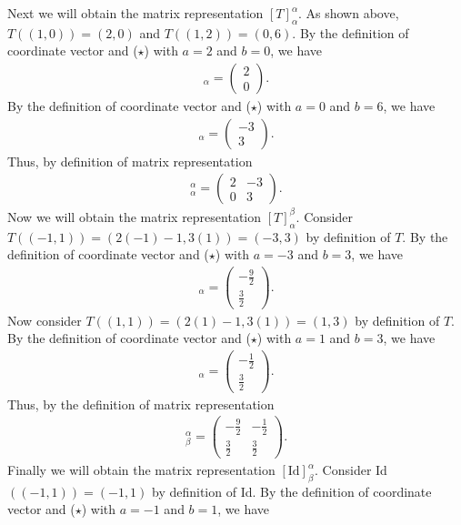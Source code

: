 \documentclass[12pt,answers]{exam}
\begin{document}
\begin{solution}
\begin{enumerate}[label=(\alph*)]
Next we will obtain the matrix representation $[T]^{\alpha}_{\alpha}$. As shown above, $T((1,0))=(2,0)$ and $T((1,2))=(0,6)$. By the definition of coordinate vector and ($\star$) with $a=2$ and $b=0$, we have
\begin{align*}
    [T(1,0)]_{\alpha}=\begin{pmatrix} 2 \\ 0 \end{pmatrix}.
\end{align*}
By the definition of coordinate vector and ($\star$) with $a=0$ and $b=6$, we have
\begin{align*}
    [T(1,2)]_{\alpha}=\begin{pmatrix} -3 \\ 3 \end{pmatrix}.
\end{align*}
Thus, by definition of matrix representation
\begin{align*}
    [T]^{\alpha}_{\alpha}=\begin{pmatrix} 2 & -3 \\ 0 & 3\end{pmatrix}.
\end{align*}
Now we will obtain the matrix representation $[T]^{\beta}_{\alpha}$. Consider $T((-1,1))=(2(-1)-1,3(1))=(-3,3)$ by definition of $T$. By the definition of coordinate vector and ($\star$) with $a=-3$ and $b=3$, we have 
\begin{align*}
    [T(-1,1)]_{\alpha}=\begin{pmatrix} -\frac{9}{2} \\ \frac{3}{2} \end{pmatrix}.
\end{align*} 
Now consider $T((1,1))=(2(1)-1,3(1))=(1,3)$ by definition of $T$. By the definition of coordinate vector and ($\star$) with $a=1$ and $b=3$, we have
\begin{align*}
    [T(1,1)]_{\alpha}=\begin{pmatrix} -\frac{1}{2} \\ \frac{3}{2} \end{pmatrix}.
\end{align*} 
Thus, by the definition of matrix representation
\begin{align*}
    [T]^{\alpha}_{\beta}=\begin{pmatrix} -\frac{9}{2} & -\frac{1}{2} \\ \frac{3}{2} & \frac{3}{2} \end{pmatrix}.
\end{align*}
Finally we will obtain the matrix representation $[\text{Id}]^{\alpha}_{\beta}$. Consider Id$((-1,1))=(-1,1)$ by definition of Id. By the definition of coordinate vector and ($\star$) with $a=-1$ and $b=1$, we have

\end{enumerate}
\end{solution}
\end{document}
